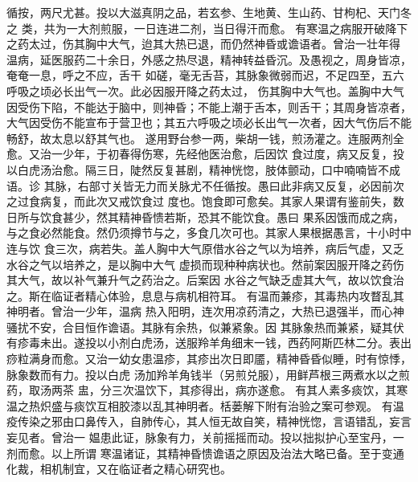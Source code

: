 \documentclass[a4paper,12pt,UTF8,twoside]{ctexbook}
\begin{document}
循按，两尺尤甚。投以大滋真阴之品，若玄参、生地黄、生山药、甘枸杞、天门冬之 
类，共为一大剂煎服，一日连进二剂，当日得汗而愈。 
有寒温之病服开破降下之药太过，伤其胸中大气，迨其大热已退，而仍然神昏或谵语者。曾治一壮年得 
温病，延医服药二十余日，外感之热尽退，精神转益昏沉。及愚视之，周身皆凉，奄奄一息，呼之不应，舌干 
如磋，毫无舌苔，其脉象微弱而迟，不足四至，五六呼吸之顷必长出气一次。此必因服开降之药太过， 
伤其胸中大气也。盖胸中大气因受伤下陷，不能达于脑中，则神昏；不能上潮于舌本，则舌干；其周身皆凉者， 
大气因受伤不能宣布于营卫也；其五六呼吸之顷必长出气一次者，因大气伤后不能畅舒，故太息以舒其气也。 
遂用野台参一两，柴胡一钱，煎汤灌之。连服两剂全愈。又治一少年，于初春得伤寒，先经他医治愈，后因饮 
食过度，病又反复，投以白虎汤治愈。隔三日，陡然反复甚剧，精神恍惚，肢体颤动，口中喃喃皆不成语。诊 
其脉，右部寸关皆无力而关脉尤不任循按。愚曰此非病又反复，必因前次之过食病复，而此次又戒饮食过 
度也。饱食即可愈矣。其家人果谓有鉴前失，数日所与饮食甚少，然其精神昏愦若斯，恐其不能饮食。愚曰 
果系因饿而成之病，与之食必然能食。然仍须撙节与之，多食几次可也。其家人果根据愚言，十小时中连与饮 
食三次，病若失。盖人胸中大气原借水谷之气以为培养，病后气虚，又乏水谷之气以培养之，是以胸中大气 
虚损而现种种病状也。然前案因服开降之药伤其大气，故以补气兼升气之药治之。后案因 
水谷之气缺乏虚其大气，故以饮食治之。斯在临证者精心体验，息息与病机相符耳。 
有温而兼疹，其毒热内攻瞀乱其神明者。曾治一少年，温病 
热入阳明，连次用凉药清之，大热已退强半，而心神骚扰不安，合目恒作谵语。其脉有余热，似兼紧象。因 
其脉象热而兼紧，疑其伏有疹毒未出。遂投以小剂白虎汤，送服羚羊角细末一钱，西药阿斯匹林二分。表出 
痧粒满身而愈。又治一幼女患温疹，其疹出次日即靥，精神昏昏似睡，时有惊悸，脉象数而有力。投以白虎 
汤加羚羊角钱半（另煎兑服），用鲜芦根三两煮水以之煎药，取汤两茶 
盅，分三次温饮下，其疹得出，病亦遂愈。 
有其人素多痰饮，其寒温之热炽盛与痰饮互相胶漆以乱其神明者。栝蒌解下附有治验之案可参观。 
有温疫传染之邪由口鼻传入，自肺传心，其人恒无故自笑，精神恍惚，言语错乱，妄言妄见者。曾治一 
媪患此证，脉象有力，关前摇摇而动。投以拙拟护心至宝丹，一剂而愈。以上所谓 
寒温诸证，其精神昏愦谵语之原因及治法大略已备。至于变通化裁，相机制宜，又在临证者之精心研究也。 
\end{document}
